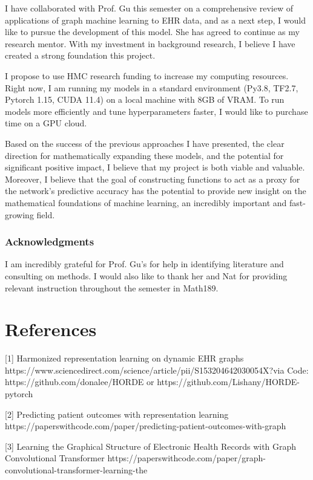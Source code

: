 \documentclass{article}
\begin{document}
I have collaborated with Prof. Gu this semester on a comprehensive review of applications of graph machine learning to EHR data, and as a next step, I would like to pursue the development of this model. She has agreed to continue as my research mentor. With my investment in background research, I believe I have created a strong foundation this project. 

I propose to use HMC research funding to increase my computing resources. Right now, I am running my models in a standard environment (Py3.8, TF2.7, Pytorch 1.15, CUDA 11.4) on a local machine with 8GB of VRAM. To run models more efficiently and tune hyperparameters faster, I would like to purchase time on a GPU cloud.

Based on the success of the previous approaches I have presented, the clear direction for mathematically expanding these models, and the potential for significant positive impact, I believe that my project is both viable and valuable. Moreover, I believe that the goal of constructing functions to act as a proxy for the network's predictive accuracy has the potential to provide new insight on the mathematical foundations of machine learning, an incredibly important and fast-growing field. 



\subsubsection*{Acknowledgments}

I am incredibly grateful for Prof. Gu's for help in identifying literature and consulting on methods. I would also like to thank her and Nat for providing relevant instruction throughout the semester in Math189. 

\pagebreak

\section*{References}
\small

[1] Harmonized representation learning on dynamic EHR graphs
https://www.sciencedirect.com/science/article/pii/S153204642030054X?via%
Code: https://github.com/donalee/HORDE or https://github.com/Lishany/HORDE-pytorch

[2] Predicting patient outcomes with representation learning
https://paperswithcode.com/paper/predicting-patient-outcomes-with-graph

[3]  Learning the Graphical Structure of Electronic Health Records with Graph Convolutional Transformer 
https://paperswithcode.com/paper/graph-convolutional-transformer-learning-the
\end{document}
